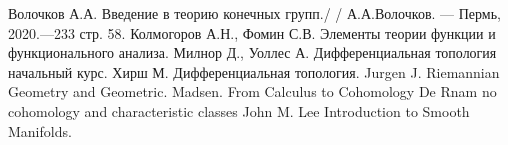 \documentclass[oneside,12pt]{book}
\theoremstyle{definition}
\theoremstyle{remark}
\numberwithin{equation}{section}
\numberwithin{equation}{section}
\newcommand{\0}{\varnothing}
\begin{document}
	
	\tableofcontents
	\newpage
	

	\begin{thebibliography}{99} %
		Волочков А.А. Введение в теорию конечных групп./ / А.А.Волочков. --- Пермь, 2020.---233 стр. 58.
		Колмогоров А.Н., Фомин С.В. Элементы теории функции и функционального анализа.
		Милнор Д., Уоллес А. Дифференциальная топология начальный курс.
		Хирш М. Дифференциальная топология.
		Jurgen J. Riemannian Geometry and Geometric.
		Madsen. From Calculus to Cohomology
		De Rnam no cohomology and characteristic classes
		John M. Lee Introduction to Smooth Manifolds.
	\end{thebibliography}
\end{document}
